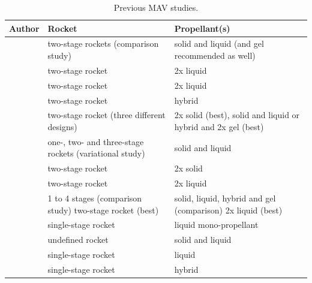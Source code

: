 \begin{table}[!ht]
\begin{center}
\caption{Previous \ac{MAV} studies.}
\label{tab:refmavstud}
\begin{tabular}{|p{5cm}|p{5cm}|p{5cm}|}
\hline 
\textbf{Author} 		 &\textbf{Rocket} & \textbf{Propellant(s)} \\ \hline \hline
\cite{whitehead1997} 		& two-stage rockets (comparison study)  & solid and liquid (and gel recommended as well)  \\ \hline
\cite{guernsey1998} 		& two-stage rocket & 2x liquid  \\ \hline
\cite{desai1998} 	& two-stage rocket & 2x liquid  \\ \hline
\cite{stone1999} 	& two-stage rocket & hybrid  \\ \hline \hline
\cite{stephenson2002} 		& two-stage rocket (three different designs) & 2x solid (best), solid and liquid or hybrid and 2x gel (best)  \\ \hline
\cite{whitehead2005} 		& one-, two- and three-stage rockets (variational study)  & solid and liquid  \\ \hline
\cite{stephenson2006} & two-stage rocket & 2x solid  \\ \hline \hline
\cite{sengupta2012} 		& two-stage rocket & 2x liquid  \\ \hline
\cite{trinidad2012} 		& 1 to 4 stages (comparison study) two-stage rocket (best)  & solid, liquid, hybrid and gel (comparison) 2x liquid (best) \\ \hline
\cite{mungas2012}	& single-stage rocket & liquid mono-propellant  \\ \hline
\cite{mppg2012}	 & undefined rocket & solid and liquid  \\ \hline \hline
\cite{vaughan2016technology} & single-stage rocket & liquid \\ \hline
\cite{karp2016technology} & single-stage rocket & hybrid \\ \hline
 		
\end{tabular}
\end{center}
\end{table} 


